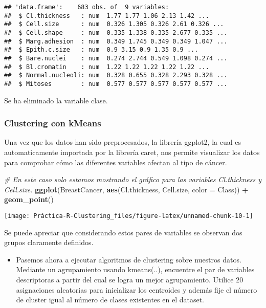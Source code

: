\documentclass[
]{article}
\newenvironment{Shaded}{\begin{snugshade}}{\end{snugshade}}
\newcommand{\CommentTok}[1]{\textcolor[rgb]{0.56,0.35,0.01}{\textit{#1}}}
\newcommand{\DataTypeTok}[1]{\textcolor[rgb]{0.13,0.29,0.53}{#1}}
\newcommand{\KeywordTok}[1]{\textcolor[rgb]{0.13,0.29,0.53}{\textbf{#1}}}
\newcommand{\NormalTok}[1]{#1}
\newcommand{\OperatorTok}[1]{\textcolor[rgb]{0.81,0.36,0.00}{\textbf{#1}}}
\newcommand{\StringTok}[1]{\textcolor[rgb]{0.31,0.60,0.02}{#1}}
\providecommand{\tightlist}{%
  \setlength{\itemsep}{0pt}\setlength{\parskip}{0pt}}
\begin{document}
\begin{verbatim}
## 'data.frame':    683 obs. of  9 variables:
##  $ Cl.thickness   : num  1.77 1.77 1.06 2.13 1.42 ...
##  $ Cell.size      : num  0.326 1.305 0.326 2.61 0.326 ...
##  $ Cell.shape     : num  0.335 1.338 0.335 2.677 0.335 ...
##  $ Marg.adhesion  : num  0.349 1.745 0.349 0.349 1.047 ...
##  $ Epith.c.size   : num  0.9 3.15 0.9 1.35 0.9 ...
##  $ Bare.nuclei    : num  0.274 2.744 0.549 1.098 0.274 ...
##  $ Bl.cromatin    : num  1.22 1.22 1.22 1.22 1.22 ...
##  $ Normal.nucleoli: num  0.328 0.655 0.328 2.293 0.328 ...
##  $ Mitoses        : num  0.577 0.577 0.577 0.577 0.577 ...
\end{verbatim}

Se ha eliminado la variable clase.

\hypertarget{clustering-con-kmeans}{%
\subsubsection{Clustering con kMeans}\label{clustering-con-kmeans}}

Una vez que los datos han sido preprocesados, la librería ggplot2, la
cual es automaticamente importada por la librería caret, nos permite
visualizar los datos para comprobar cómo las diferentes variables
afectan al tipo de cáncer.

\begin{Shaded}
\begin{Highlighting}[]
\CommentTok{# En este caso solo estamos mostrando el gráfico para las variables Cl.thickness y Cell.size.}
\KeywordTok{ggplot}\NormalTok{(BreastCancer, }\KeywordTok{aes}\NormalTok{(Cl.thickness, Cell.size, }\DataTypeTok{color =}\NormalTok{ Class)) }\OperatorTok{+}\StringTok{ }\KeywordTok{geom_point}\NormalTok{()}
\end{Highlighting}
\end{Shaded}

\begin{center}\texttt{[image: Práctica-R-Clustering\_files/figure-latex/unnamed-chunk-10-1]} \end{center}

Se puede apreciar que considerando estos pares de variables se observan
dos grupos claramente definidos.

\begin{itemize}
\tightlist
\item
  Pasemos ahora a ejecutar algoritmos de clustering sobre nuestros
  datos. Mediante un agrupamiento usando kmeans(..), encuentre el par de
  variables descriptoras a partir del cual se logra un mejor
  agrupamiento. Utilice 20 asignaciones aleatorias para inicializar los
  centroides y además fije el número de cluster igual al número de
  clases existentes en el dataset.
\end{itemize}
\end{document}
